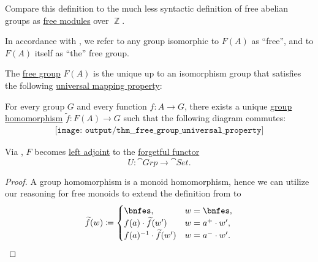 \begin{comments}
  \item Compare this definition to the much less syntactic definition of free abelian groups as \hyperref[def:free_semimodule]{free modules} over \( \BbbZ \).

  \item In accordance with , we refer to any group isomorphic to \( F(A) \) as \enquote{free}, and to \(F(A) \) itself as \enquote{the} free group.
\end{comments}

\begin{theorem}\label{thm:free_group_universal_property}
  The \hyperref[def:free_group]{free group} \( F(A) \) is the unique up to an isomorphism group that satisfies the following \hyperref[rem:universal_mapping_property]{universal mapping property}:
  \begin{displayquote}
    For every group \( G \) and every function \( f: A \to G \), there exists a unique \hyperref[def:group/homomorphism]{group homomorphism} \( \widetilde{f}: F(A) \to G \) such that the following diagram commutes:
    \begin{equation}\label{eq:thm:free_group_universal_property/diagram}
      \begin{aligned}
        \texttt{[image: output/thm\_\_free\_group\_universal\_property]}
      \end{aligned}
    \end{equation}
  \end{displayquote}
\end{theorem}
\begin{comments}
  \item Via , \( F \) becomes \hyperref[def:category_adjunction]{left adjoint} to the \hyperref[def:concrete_category]{forgetful functor}
  \begin{equation*}
    U: \cat{Grp} \to \cat{Set}.
  \end{equation*}
\end{comments}
\begin{proof}
  A group homomorphism is a monoid homomorphism, hence we can utilize our reasoning for free monoids to extend the definition from  to
  \begin{equation*}
    \widetilde{f}(w) \coloneqq \begin{cases}
      \bnfes,                      &w = \bnfes, \\
      f(a) \cdot \widetilde{f}(w')      &w = a^+ \cdot w', \\
      f(a)^{-1} \cdot \widetilde{f}(w') &w = a^- \cdot w'.
    \end{cases}
  \end{equation*}
\end{proof}

